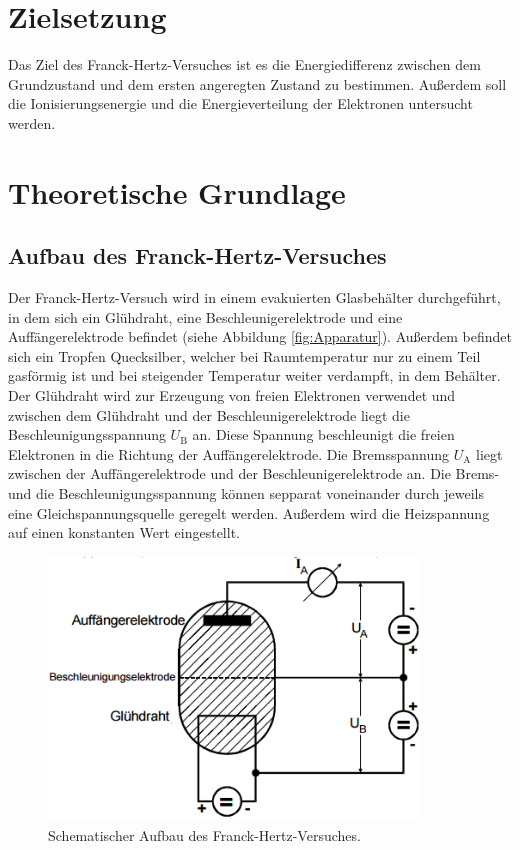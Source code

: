 \section{Zielsetzung}
Das Ziel des Franck-Hertz-Versuches ist es die Energiedifferenz zwischen dem Grundzustand und dem ersten angeregten Zustand zu bestimmen. Außerdem soll die Ionisierungsenergie und die Energieverteilung der Elektronen untersucht werden.

\section{Theoretische Grundlage}
\label{sec:Theorie}
\subsection{Aufbau des Franck-Hertz-Versuches}
Der Franck-Hertz-Versuch wird in einem evakuierten Glasbehälter durchgeführt, in dem sich ein Glühdraht, eine Beschleunigerelektrode und eine Auffängerelektrode befindet (siehe Abbildung \eqref{fig:Apparatur}). Außerdem befindet sich ein Tropfen Quecksilber, welcher bei Raumtemperatur nur zu einem Teil gasförmig ist und bei steigender Temperatur weiter verdampft, in dem Behälter. Der Glühdraht wird zur Erzeugung von freien Elektronen verwendet und zwischen dem Glühdraht und der Beschleunigerelektrode liegt die Beschleunigungsspannung $U_\text{B}$ an. Diese Spannung beschleunigt die freien Elektronen in die Richtung der Auffängerelektrode. Die Bremsspannung $U_\text{A}$ liegt zwischen der Auffängerelektrode und der Beschleunigerelektrode an. Die Brems- und die Beschleunigungsspannung können sepparat voneinander durch jeweils eine Gleichspannungsquelle geregelt werden. Außerdem wird die Heizspannung auf einen konstanten Wert eingestellt.

\begin{figure}[H]
  \centering
  \includegraphics[height=7cm]{picture/Franck-Hertz-Apparatur}
  \caption{Schematischer Aufbau des Franck-Hertz-Versuches. \cite[2]{sample}}
  \label{fig:Apparatur}
\end{figure}

